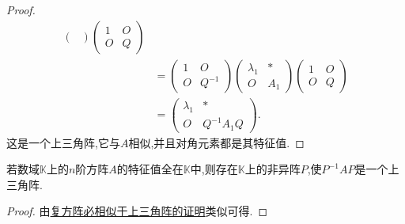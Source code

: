 \documentclass[../../main.tex]{subfiles}%
\begin{document}
\begin{proof}
\begin{align*}
\begin{pmatrix}
\end{pmatrix} \begin{pmatrix}
1 & O \\
O & Q
\end{pmatrix} \\
&= \begin{pmatrix}
1 & O \\
O & Q^{-1}
\end{pmatrix} \begin{pmatrix}
\lambda_1 & * \\
O & A_1
\end{pmatrix} \begin{pmatrix}
1 & O \\
O & Q
\end{pmatrix} \\
&= \begin{pmatrix}
\lambda_1 & * \\
O & Q^{-1}A_1Q
\end{pmatrix}.
\end{align*}
这是一个上三角阵,它与$A$相似,并且对角元素都是其特征值.

\end{proof}

\begin{corollary}\label{corollary:特征值全在矩阵元素的数域中则一定相似于上三角阵}
若数域$\mathbb{K}$上的$n$阶方阵$A$的特征值全在$\mathbb{K}$中,则存在$\mathbb{K}$上的非异阵$P$,使$P^{-1}AP$是一个上三角阵.
\end{corollary}
\begin{proof}

由\hyperref[theorem:复方阵必相似于上三角阵]{复方阵必相似于上三角阵的证明}类似可得.

\end{proof}
\end{document}
